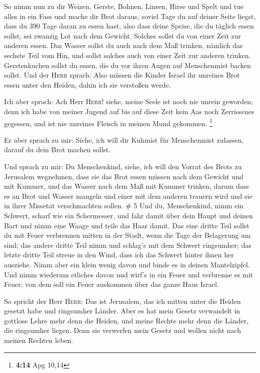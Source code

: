  So nimm nun zu dir Weizen, Gerste, Bohnen, Linsen, Hirse
und Spelt und tue alles in ein Fass und mache dir Brot daraus, soviel
Tage du auf deiner Seite liegst, dass du 390 Tage daran zu essen hast,
 also dass deine Speise, die du täglich essen sollst, sei
zwanzig Lot nach dem Gewicht. Solches sollst du von einer Zeit zur
anderen essen.  Das Wasser sollst du auch nach dem Maß
trinken, nämlich das sechste Teil vom Hin, und sollst solches auch von
einer Zeit zur anderen trinken.  Gerstenkuchen sollst du
essen, die du vor ihren Augen auf Menschenmist backen sollst.
 Und der \textsc{Herr} sprach: Also müssen die Kinder
Israel ihr unreines Brot essen unter den Heiden, dahin ich sie verstoßen
werde.

 Ich aber sprach: Ach Herr \textsc{Herr}! siehe, meine
Seele ist noch nie unrein geworden; denn ich habe von meiner Jugend auf
bis auf diese Zeit kein Aas noch Zerrissenes gegessen, und ist nie
unreines Fleisch in meinen Mund gekommen. \footnote{\textbf{4:14} Apg
  10,14}

 Er aber sprach zu mir: Siehe, ich will dir Kuhmist für
Menschenmist zulassen, darauf du dein Brot machen sollst.

 Und sprach zu mir: Du Menschenkind, siehe, ich will den
Vorrat des Brots zu Jerusalem wegnehmen, dass sie das Brot essen müssen
nach dem Gewicht und mit Kummer, und das Wasser nach dem Maß mit Kummer
trinken,  darum dass es an Brot und Wasser mangeln und
einer mit dem anderen trauern wird und sie in ihrer Missetat
verschmachten sollen. \# 5  Und du, Menschenkind, nimm ein
Schwert, scharf wie ein Schermesser, und fahr damit über dein Haupt und
deinen Bart und nimm eine Waage und teile das Haar damit. 
Das eine dritte Teil sollst du mit Feuer verbrennen mitten in der Stadt,
wenn die Tage der Belagerung um sind; das andere dritte Teil nimm und
schlag's mit dem Schwert ringsumher; das letzte dritte Teil streue in
den Wind, dass ich das Schwert hinter ihnen her ausziehe. 
Nimm aber ein klein wenig davon und binde es in deinen Mantelzipfel.
 Und nimm wiederum etliches davon und wirf's in ein Feuer
und verbrenne es mit Feuer; von dem soll ein Feuer auskommen über das
ganze Haus Israel.

 So spricht der Herr \textsc{Herr}: Das ist Jerusalem, das
ich mitten unter die Heiden gesetzt habe und ringsumher Länder.
 Aber es hat mein Gesetz verwandelt in gottlose Lehre mehr
denn die Heiden, und meine Rechte mehr denn die Länder, die ringsumher
liegen. Denn sie verwerfen mein Gesetz und wollen nicht nach meinen
Rechten leben.

